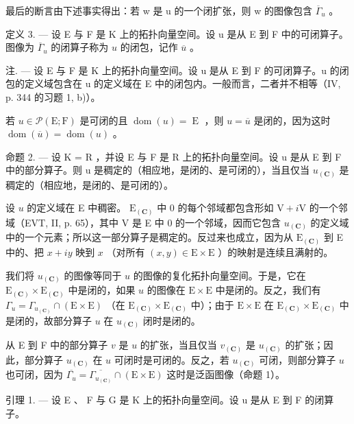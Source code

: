 最后的断言由下述事实得出：若 w 是 u 的一个闭扩张，则 w 的图像包含 \(\overline{\Gamma}_{u}\) 。

定义 3. --- 设 E 与 F 是 K 上的拓扑向量空间。设 u 是从 E 到 F 中的可闭算子。图像为 \(\overline{\Gamma}_{u}\) 的闭算子称为 \(u\) 的闭包，记作 \(\overline{u}\) 。

注. --- 设 E 与 F 是 K 上的拓扑向量空间。设 u 是从 E 到 F 的可闭算子。u 的闭包的定义域包含在 u 的定义域在 E 中的闭包内。一般而言，二者并不相等（IV, p. 344 的习题 1, b)）。

若 \(u \in \mathcal{P}(\mathrm{E};\mathrm{F})\) 是可闭的且 \(\operatorname{dom}(u) = \operatorname{E}\) ，则 \(u = \overline{u}\) 是闭的，因为这时 \(\operatorname{dom}(\overline{u}) = \operatorname{dom}(u)\) 。

命题 2. --- 设 K = R ，并设 E 与 F 是 R 上的拓扑向量空间。设 u 是从 E 到 F 中的部分算子。则 u 是稠定的（相应地，是闭的、是可闭的），当且仅当 \(u_{(\mathbf{C})}\) 是稠定的（相应地，是闭的、是可闭的）。

设 \(u\) 的定义域在 E 中稠密。 \(\mathrm{E}_{(\mathbf{C})}\) 中 0 的每个邻域都包含形如 \(\mathrm{V} + i\mathrm{V}\) 的一个邻域（EVT, II, p. 65），其中 V 是 E 中 0 的一个邻域，因而它包含 \(u_{(\mathbf{C})}\) 的定义域中的一个元素；所以这一部分算子是稠定的。反过来也成立，因为从 \(\mathrm{E}_{(\mathbf{C})}\) 到 E 中的、把 \(x + iy\) 映到 \(x\) （对所有 \((x,y) \in \mathrm{E} \times \mathrm{E}\) ）的映射是连续且满射的。

我们将 \(u_{(\mathbf{C})}\) 的图像等同于 \(u\) 的图像的复化拓扑向量空间。于是，它在 \(\mathrm{E}_{(\mathbf{C})} \times \mathrm{E}_{(\mathbf{C})}\) 中是闭的，如果 \(u\) 的图像在 \(\mathrm{E} \times \mathrm{E}\) 中是闭的。反之，我们有 \(\Gamma_u = \Gamma_{u_{(\mathbf{C})}} \cap (\mathrm{E} \times \mathrm{E})\) （在 \(\mathrm{E}_{(\mathbf{C})} \times \mathrm{E}_{(\mathbf{C})}\) 中）；由于 \(\mathrm{E} \times \mathrm{E}\) 在 \(\mathrm{E}_{(\mathbf{C})} \times \mathrm{E}_{(\mathbf{C})}\) 中是闭的，故部分算子 \(u\) 在 \(u_{(\mathbf{C})}\) 闭时是闭的。

从 E 到 F 中的部分算子 \(v\) 是 \(u\) 的扩张，当且仅当 \(v_{(\mathbf{C})}\) 是 \(u_{(\mathbf{C})}\) 的扩张；因此，部分算子 \(u_{(\mathbf{C})}\) 在 \(u\) 可闭时是可闭的。反之，若 \(u_{(\mathbf{C})}\) 可闭，则部分算子 \(u\) 也可闭，因为 \(\overline{\Gamma_u} = \overline{\Gamma_{u_{(\mathbf{C})}}} \cap (\mathrm{E} \times \mathrm{E})\) 这时是泛函图像（命题 1）。

引理 1. — 设 E 、 F 与 G 是 K 上的拓扑向量空间。设 u 是从 E 到 F 的闭算子。


